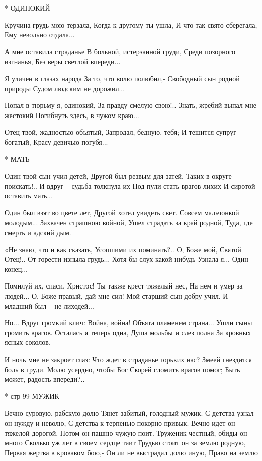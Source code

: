 * ОДИНОКИЙ

Кручина грудь мою терзала,
Когда к другому ты ушла,
И что так свято сберегала,
Ему невольно отдала...

А мне оставила страданье
В больной, истерзанной груди,
Среди позорного изгнанья,
Без веры светлой впереди...

Я уличен в глазах народа
За то, что волю полюбил,-
Свободный сын родной природы
Судом людским не дорожил...

Попал в тюрьму я, одинокий,
За правду смелую свою!..
Знать, жребий выпал мне жестокий
Погибнуть здесь, в чужом краю...

Отец твой, жадностью объятый,
Запродал, бедную, тебя;
И тешится супруг богатый,
Красу девичью погубя...


* МАТЬ

Один твой сын учил детей,
Другой был резвым для затей.
Таких в округе поискать!..
И вдруг – судьба толкнула их
Под пули стать врагов лихих
И сиротой оставить мать...


Один был взят во цвете лет,
Другой хотел увидеть свет.
Совсем мальчонкой молодым...
Захвачен страшною войной,
Ушел страдать за край родной,
Туда, где смерть и адский дым.

«Не знаю, что и как сказать,
Усопшими их поминать?..
О, Боже мой, Святой Отец!..
От горести изныла грудь...
Хотя бы слух какой-нибудь
Узнала я... Один конец...

Помилуй их, спаси, Христос!
Ты также крест тяжелый нес,
На нем и умер за людей...
О, Боже правый, дай мне сил!
Мой старший сын добру учил.
И младший был – не лиходей...

Но... Вдруг громкий клич: Война, война!
Объята пламенем страна...
Ушли сыны громить врагов.
Осталась я теперь одна,
Душа мольбы и слез полна
За кровных ясных соколов.

И ночь мне не закроет глаз:
Что ждет в страданье горьких нас?
Змеей гнездится боль в груди.
Молю усердно, чтобы Бог
Скорей сломить врагов помог;
Быть может, радость впереди?..


* стр 99  МУЖИК

Вечно суровую, рабскую долю
Тянет забитый, голодный мужик.
С детства узнал он нужду и неволю,
С детства к терпенью покорно привык.
Вечно идет он тяжелой дорогой,
Потом он пашню чужую поит.
Труженик честный, обиды он много
Сколько уж лет в своем сердце таит
Грудью стоит он за землю родную,
Первая жертва в кровавом бою,-
Он ли не выстрадал долю иную,
Право на землю




